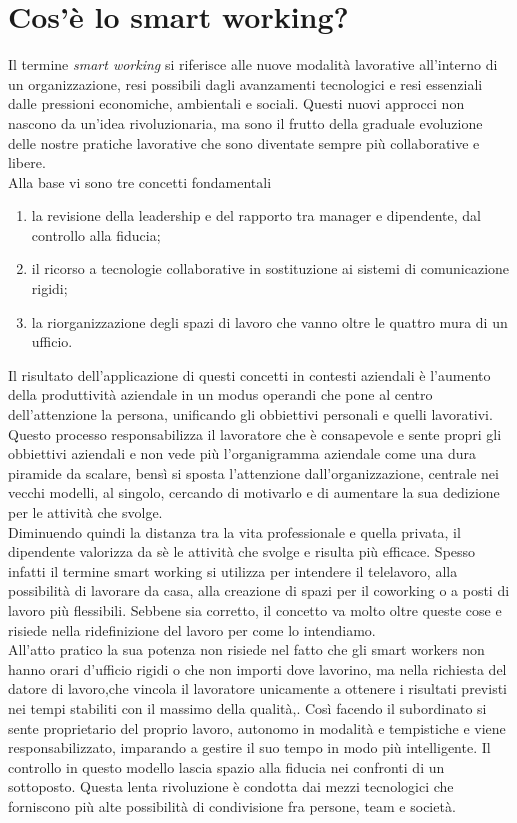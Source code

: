 
\section{Cos'è lo smart working?}
Il termine \textit{smart working} si riferisce alle nuove modalità lavorative all'interno di un organizzazione, resi possibili dagli avanzamenti tecnologici e resi essenziali dalle pressioni economiche, ambientali e sociali. Questi nuovi approcci non nascono da un'idea rivoluzionaria, ma sono il frutto della graduale evoluzione delle nostre pratiche lavorative che sono diventate sempre più collaborative e libere. \\Alla base vi sono tre concetti fondamentali 
\begin{enumerate}
	\item la revisione della leadership e del rapporto tra manager e dipendente, dal controllo alla fiducia;
	\item il ricorso a tecnologie collaborative in sostituzione ai sistemi di comunicazione rigidi;
	\item la riorganizzazione degli spazi di lavoro che vanno oltre le quattro mura di un ufficio.
\end{enumerate}
\newpage
Il risultato dell'applicazione di questi concetti in contesti aziendali è l'aumento della produttività aziendale in un modus operandi che pone al centro dell'attenzione la persona, unificando gli obbiettivi personali e quelli lavorativi. Questo processo responsabilizza il lavoratore che è consapevole e sente propri gli obbiettivi aziendali e non vede più l'organigramma aziendale come una dura piramide da scalare, bensì si sposta l'attenzione dall'organizzazione, centrale nei vecchi modelli, al singolo, cercando di motivarlo e di aumentare la sua dedizione per le attività che svolge.\\
Diminuendo quindi la distanza tra la vita professionale e quella privata, il dipendente valorizza da sè le attività che svolge e risulta più efficace.
Spesso infatti il termine smart working si utilizza per intendere il telelavoro, alla possibilità di lavorare da casa, alla creazione di spazi per il coworking o a posti di lavoro più flessibili. Sebbene sia corretto, il concetto va molto oltre queste cose e risiede nella ridefinizione del lavoro per come lo intendiamo.\\ All'atto pratico la sua potenza non risiede nel fatto che gli smart workers non hanno orari d'ufficio rigidi o che non importi dove lavorino, ma nella richiesta del datore di lavoro,che vincola il lavoratore unicamente a ottenere i risultati previsti nei tempi stabiliti con il massimo della qualità,. Così facendo il subordinato si sente proprietario del proprio lavoro, autonomo in modalità e tempistiche e viene responsabilizzato, imparando a gestire il suo tempo in modo più intelligente. Il controllo in questo modello lascia spazio alla fiducia nei confronti di un sottoposto. Questa lenta rivoluzione è condotta dai mezzi tecnologici che forniscono più alte possibilità di condivisione fra persone, team e società.\\ \newpage
